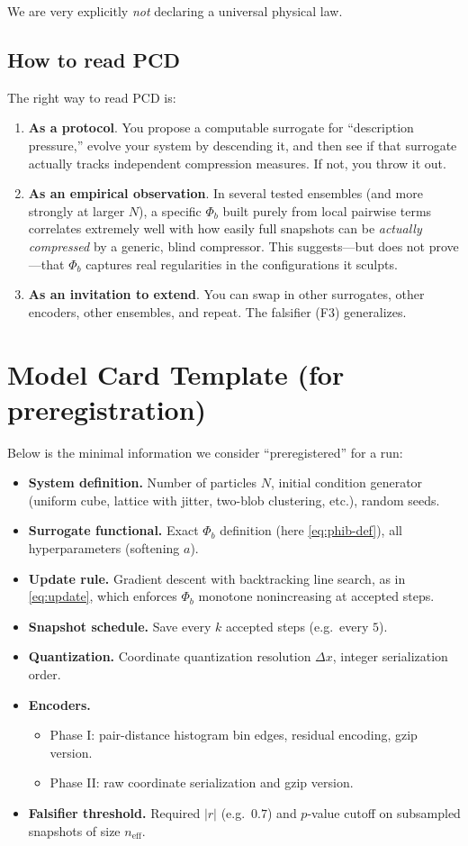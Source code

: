 \documentclass[11pt,a4paper]{article}
\numberwithin{equation}{section}
\newcommand{\phib}{\Phi_b}
\begin{document}
We are very explicitly \emph{not} declaring a universal physical law.

\subsection{How to read PCD}
The right way to read PCD is:
\begin{enumerate}[label=(\alph*)]
\item \textbf{As a protocol}. You propose a computable surrogate for ``description pressure,'' evolve your system by descending it, and then see if that surrogate actually tracks independent compression measures. If not, you throw it out.

\item \textbf{As an empirical observation}. In several tested ensembles (and more strongly at larger $N$), a specific $\phib$ built purely from local pairwise terms correlates extremely well with how easily full snapshots can be \emph{actually compressed} by a generic, blind compressor. This suggests---but does not prove---that $\phib$ captures real regularities in the configurations it sculpts.

\item \textbf{As an invitation to extend}. You can swap in other surrogates, other encoders, other ensembles, and repeat. The falsifier (F3) generalizes.
\end{enumerate}

\section{Model Card Template (for preregistration)}
Below is the minimal information we consider ``preregistered'' for a run:
\begin{itemize}
\item \textbf{System definition.} Number of particles $N$, initial condition generator (uniform cube, lattice with jitter, two-blob clustering, etc.), random seeds.
\item \textbf{Surrogate functional.} Exact $\phib$ definition (here \cref{eq:phib-def}), all hyperparameters (softening $a$).
\item \textbf{Update rule.} Gradient descent with backtracking line search, as in \cref{eq:update}, which enforces $\phib$ monotone nonincreasing at accepted steps.
\item \textbf{Snapshot schedule.} Save every $k$ accepted steps (e.g.\ every $5$).
\item \textbf{Quantization.} Coordinate quantization resolution $\Delta x$, integer serialization order.
\item \textbf{Encoders.}
  \begin{itemize}
  \item Phase I: pair-distance histogram bin edges, residual encoding, gzip version.
  \item Phase II: raw coordinate serialization and gzip version.
  \end{itemize}
\item \textbf{Falsifier threshold.} Required $|r|$ (e.g.\ $0.7$) and $p$-value cutoff on subsampled snapshots of size $n_{\text{eff}}$.
\end{itemize}
\end{document}

